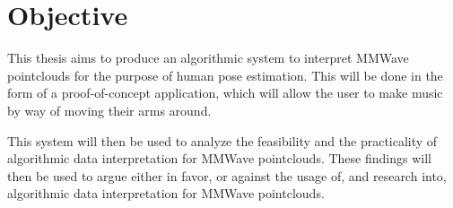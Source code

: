 \section{Objective}
\label{section: introduction - objective}

This thesis aims to produce an algorithmic system to interpret MMWave pointclouds for the purpose of human pose estimation. 
This will be done in the form of a proof-of-concept application, which will allow the user to make music by way of moving their arms around.

This system will then be used to analyze the feasibility and the practicality of algorithmic data interpretation for MMWave pointclouds.
These findings will then be used to argue either in favor, or against the usage of, and research into, algorithmic data interpretation for MMWave pointclouds.

